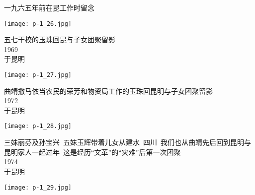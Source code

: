 \begin{tcolorbox}[notitle,grow to right by=1in,boxrule=0pt,colback=DarkRed,colframe=DarkRed]
    \fontsize{1cm}{0.9cm}\selectfont
    \raggedleft
    \noindent
    一九六五年前在昆工作时留念\\
    \Large

    
\end{tcolorbox}
\begin{center}
    \texttt{[image: p-1\_26.jpg]}
\end{center}
\clearpage


\begin{tcolorbox}[notitle,grow to right by=1in,boxrule=0pt,colback=DarkRed,colframe=DarkRed]
    \fontsize{1cm}{0.9cm}\selectfont
    \raggedleft
    \noindent
    五七干校的玉珠回昆与子女团聚留影\\
    \Large
    1969\\
    于昆明
\end{tcolorbox}
\begin{center}
    \texttt{[image: p-1\_27.jpg]}
\end{center}
\clearpage


\begin{tcolorbox}[notitle,grow to right by=1in,boxrule=0pt,colback=DarkRed,colframe=DarkRed]
    \fontsize{1cm}{0.9cm}\selectfont
    \raggedleft
    \noindent
    曲靖撒马依当农民的荣芳和物资局工作的玉珠回昆明与子女团聚留影\\
    \Large
    1972\\
    于昆明
\end{tcolorbox}
\begin{center}
    \texttt{[image: p-1\_28.jpg]}
\end{center}
\clearpage


\begin{tcolorbox}[notitle,grow to right by=1in,boxrule=0pt,colback=DarkRed,colframe=DarkRed]
    \fontsize{1cm}{0.9cm}\selectfont
    \raggedleft
    \noindent
    三妹丽芬及孙宝兴~五妹玉辉带着儿女从建水~四川~我们也从曲靖先后回到昆明与昆明家人一起过年~这是经历“文革”的“灾难”后第一次团聚\\
    \Large
    1974\\
    于昆明
\end{tcolorbox}
\begin{center}
    \texttt{[image: p-1\_29.jpg]}
\end{center}
\clearpage


